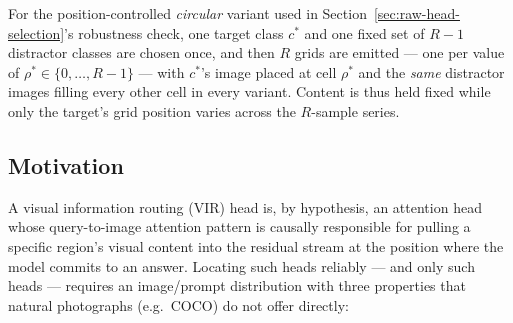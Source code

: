 For the position-controlled \emph{circular} variant used in
Section~\ref{sec:raw-head-selection}'s robustness check, one target class
$c^{*}$ and one fixed set of $R-1$ distractor classes are chosen once, and
then $R$ grids are emitted — one per value of $\rho^{*} \in \{0,\dots,R-1\}$
— with $c^{*}$'s image placed at cell $\rho^{*}$ and the \emph{same}
distractor images filling every other cell in every variant. Content is thus
held fixed while only the target's grid position varies across the $R$-sample
series.

\subsection{Motivation}

A visual information routing (VIR) head is, by hypothesis, an attention head
whose query-to-image attention pattern is causally responsible for pulling a
specific region's visual content into the residual stream at the position
where the model commits to an answer. Locating such heads reliably —
and only such heads — requires an image/prompt distribution with three
properties that natural photographs (e.g.\ COCO) do not offer directly:

